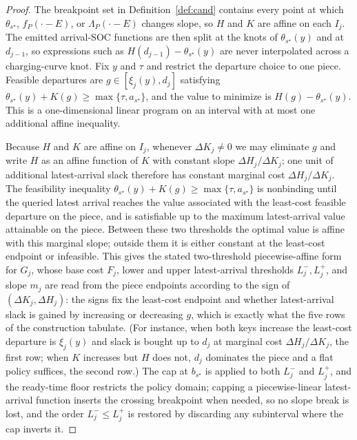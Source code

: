 \documentclass[review,3p,authoryear]{elsarticle}
\theoremstyle{plain}
\theoremstyle{definition}
\theoremstyle{remark}
\begin{document}
\begin{proof}
The breakpoint set in Definition~\ref{def:cand} contains every point at which
$\theta_{s^\star}$, $f_P(\cdot-E)$, or $\Lambda_P(\cdot-E)$ changes slope, so $H$ and
$K$ are affine on each $I_j$. The emitted arrival-SOC functions are then split at
the knots of $\theta_{s^\star}(y)$ and at $d_{j-1}$, so expressions such as
$H(d_{j-1})-\theta_{s^\star}(y)$ are never interpolated across a charging-curve
knot. Fix \(y\) and \(\tau\) and restrict the departure choice to one piece. Feasible
departures are \(g\in[\xi_j(y),d_j]\) satisfying
$\theta_{s^\star}(y)+K(g)\ge \max\{\tau,a_{s^\star}\}$,
and the value to minimize is \(H(g)-\theta_{s^\star}(y)\). This is a one-dimensional
linear program on an interval with at most one additional affine inequality.

Because $H$ and $K$ are affine on $I_j$, whenever $\Delta K_j\ne0$ we may eliminate $g$
and write $H$ as an affine function of $K$ with constant slope $\Delta H_j/\Delta K_j$;
one unit of additional latest-arrival slack therefore has constant marginal cost
$\Delta H_j/\Delta K_j$. The feasibility inequality
$\theta_{s^\star}(y)+K(g)\ge\max\{\tau,a_{s^\star}\}$ is nonbinding until the queried
latest arrival reaches the value associated with the least-cost feasible departure on
the piece, and is satisfiable up to the maximum latest-arrival value attainable on the
piece. Between these two thresholds the optimal value is affine with this marginal
slope; outside them it is either constant at the least-cost endpoint or infeasible.
This gives the stated two-threshold piecewise-affine form for $G_j$, whose base cost
$F_j$, lower and upper latest-arrival thresholds $L_j^-,L_j^+$, and slope $m_j$ are
read from the piece endpoints according to the sign of $(\Delta K_j,\Delta H_j)$: the
signs fix the least-cost endpoint and whether latest-arrival slack is gained by
increasing or decreasing $g$, which is exactly what the five rows of the construction
tabulate. (For instance, when both keys increase the least-cost departure is $\xi_j(y)$
and slack is bought up to $d_j$ at marginal cost $\Delta H_j/\Delta K_j$, the first row;
when $K$ increases but $H$ does not, $d_j$ dominates the piece and a flat policy
suffices, the second row.) The
cap at $b_{s^\star}$ is applied to both $L_j^-$ and $L_j^+$, and the ready-time floor
restricts the policy domain; capping a piecewise-linear latest-arrival function inserts
the crossing breakpoint when needed, so no slope break is lost, and the order
$L_j^-\le L_j^+$ is restored by discarding any subinterval where the cap inverts it.


\end{proof}
\end{document}
